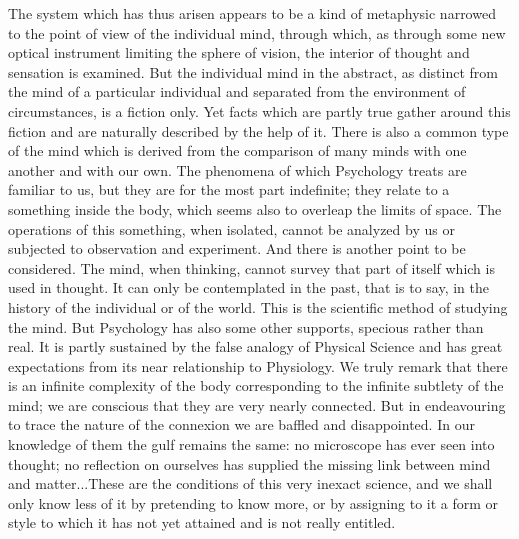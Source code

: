 \documentclass[11pt,letter]{article}
\begin{document}
\par  The system which has thus arisen appears to be a kind of metaphysic narrowed to the point of view of the individual mind, through which, as through some new optical instrument limiting the sphere of vision, the interior of thought and sensation is examined. But the individual mind in the abstract, as distinct from the mind of a particular individual and separated from the environment of circumstances, is a fiction only. Yet facts which are partly true gather around this fiction and are naturally described by the help of it. There is also a common type of the mind which is derived from the comparison of many minds with one another and with our own. The phenomena of which Psychology treats are familiar to us, but they are for the most part indefinite; they relate to a something inside the body, which seems also to overleap the limits of space. The operations of this something, when isolated, cannot be analyzed by us or subjected to observation and experiment. And there is another point to be considered. The mind, when thinking, cannot survey that part of itself which is used in thought. It can only be contemplated in the past, that is to say, in the history of the individual or of the world. This is the scientific method of studying the mind. But Psychology has also some other supports, specious rather than real. It is partly sustained by the false analogy of Physical Science and has great expectations from its near relationship to Physiology. We truly remark that there is an infinite complexity of the body corresponding to the infinite subtlety of the mind; we are conscious that they are very nearly connected. But in endeavouring to trace the nature of the connexion we are baffled and disappointed. In our knowledge of them the gulf remains the same: no microscope has ever seen into thought; no reflection on ourselves has supplied the missing link between mind and matter...These are the conditions of this very inexact science, and we shall only know less of it by pretending to know more, or by assigning to it a form or style to which it has not yet attained and is not really entitled.
\end{document}
